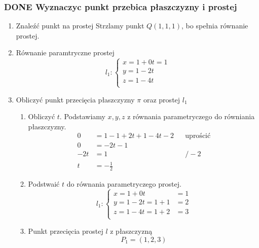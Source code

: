 \documentclass[11pt]{article}
\begin{document}
\subsubsection{{\bfseries\sffamily DONE} Wyznaczyc punkt przebica płaszczyzny i prostej}
\label{sec:org6b8260c}
\begin{enumerate}
\item Znaleźć punkt na prostej
\label{sec:org70f737c}
Strzlamy punkt \(Q(1,1,1)\), bo spełnia równanie prostej.
\item Równanie paramtryczne prostej
\label{sec:org4f847ed}
\[l_1 : \begin{cases}
        x = 1 + 0t = 1\\
        y = 1 - 2t \\
        z = 1 - 4t\\
\end{cases}\]
\item Obliczyć punkt przecięcia płaszczyzny \(\pi\) oraz prostej \(l_1\)
\label{sec:orgdabdb78}
\begin{enumerate}
\item Obliczyć \(t\).
\label{sec:org1e9c972}
Podstawiamy \(x, y, z\) z równania parametryczego do równiania płaszczyzny.
\begin{align*}
  0 &= 1 - 1 + 2t + 1 - 4t -2 && \text{uprościć}
  \\
  0 &= -2t -1
  \\
  -2t &= 1 && / -2
  \\
  t &= - \frac{1}{2}
\end{align*}
\item Podstwaić \(t\) do równania parametryczego prostej.
\label{sec:org6a731b6}
\[l_1 : \begin{cases}
        x = 1 + 0t &= 1\\
        y = 1 - 2t = 1 + 1 &= 2 \\
        z = 1 - 4t = 1 + 2 &= 3\\
\end{cases}\]
\item Punkt przecięcia prostej \(l\) z płaszczyzną
\label{sec:org66d202b}
\[P_1 = (1, 2, 3)\]
\end{enumerate}
\end{enumerate}
\end{document}
